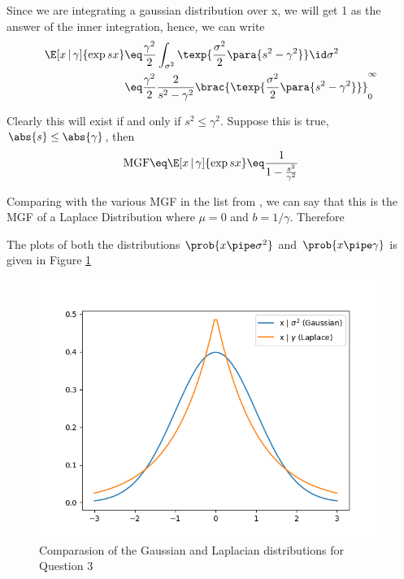 \documentclass{article}
\begin{document}
\begin{question}
	Since we are integrating a gaussian distribution over x, we will get 1 as the answer of the inner integration, hence, we can write
	\begin{align*}
		\E[x \,|\, \gamma]{\exp{sx}}	&\eq	\frac{\gamma^2}{2} \int_{\sigma^2} \texp{\frac{\sigma^2}{2} \para{s^2 - \gamma^2}} \id \sigma^2 \\
		&\eq	\frac{\gamma^2}{2} \frac{2}{s^2 - \gamma^2} \brac{\texp{\frac{\sigma^2}{2} \para{s^2 - \gamma^2}}}_0^\infty
	\end{align*}

	Clearly this will exist if and only if $s^2 \le \gamma^2$.
	Suppose this is true, \ie $\abs{s} \le \abs{\gamma}$, then
	\begin{align*}
		\text{MGF}	\eq	\E[x \,|\, \gamma]{\exp{sx}}	\eq	\frac{1}{1 - \frac{s^2}{\gamma^2}}
	\end{align*}

	Comparing with the various MGF in the list from \cite{wiki-mgf}, we can say that this is the MGF of a Laplace Distribution where $\mu = 0$ and $b = 1 / \gamma$.
	Therefore

	The plots of both the distributions $\prob{x \pipe \sigma^2}$ and $\prob{x \pipe \gamma}$ is given in Figure \ref{fig:q3-plot}

	\begin{figure}[h!]
		\centering
		\includegraphics{includes/plots/q3/q3-plot.png}
		\caption{Comparasion of the Gaussian and Laplacian distributions for Question 3}
		\label{fig:q3-plot}
	\end{figure}

\end{question}
\end{document}
